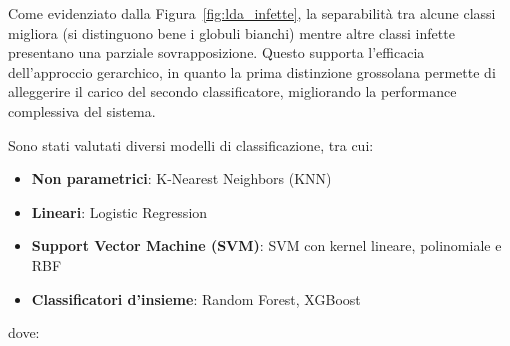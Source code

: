 \documentclass[minted, draw]{../tex/hebdomon}
\begin{document}
\begin{itemize}
Come evidenziato dalla Figura~\ref{fig:lda_infette}, la separabilità tra alcune classi migliora (si distinguono bene i globuli bianchi) mentre altre classi infette presentano una parziale sovrapposizione. Questo supporta l’efficacia dell’approccio gerarchico, in quanto la prima distinzione grossolana permette di alleggerire il carico del secondo classificatore, migliorando la performance complessiva del sistema.

\end{itemize}

Sono stati valutati diversi modelli di classificazione, tra cui:


\begin{itemize}
\item \textbf{Non parametrici}: K-Nearest Neighbors (KNN)
\item \textbf{Lineari}: Logistic Regression
\item \textbf{Support Vector Machine (SVM)}: SVM con kernel lineare, polinomiale e RBF 
\item \textbf{Classificatori d’insieme}: Random Forest, XGBoost
\end{itemize}

dove:
\end{document}
